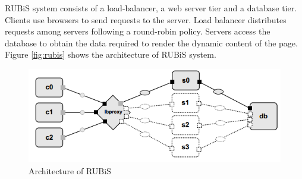 \documentclass[sigconf]{acmart}
\begin{document}
RUBiS system consists of a load-balancer, a web server tier and a database tier. Clients use browsers to send requests to the server. Load balancer distributes requests among servers following a round-robin policy. Servers access the database to obtain the data required to render the dynamic content of the page.
Figure \ref{fig:rubis} shows the architecture of RUBiS system. 
\begin{figure}[h]
	\centering
	\includegraphics[width=\linewidth]{rubis}
	\caption{Architecture of RUBiS}
\end{figure}
\end{document}
